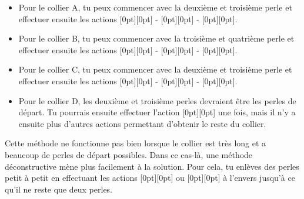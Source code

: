 {{\begin{itemize}
  \item Pour le collier A, tu peux commencer avec la deuxième et troisième perle et effectuer ensuite les actions \raisebox{-0.5ex}[0pt][0pt]{} - \raisebox{-0.5ex}[0pt][0pt]{} - \raisebox{-0.5ex}[0pt][0pt]{}.
  \item Pour le collier B, tu peux commencer avec la troisième et quatrième perle et effectuer ensuite les actions \raisebox{-0.5ex}[0pt][0pt]{} - \raisebox{-0.5ex}[0pt][0pt]{} - \raisebox{-0.5ex}[0pt][0pt]{}.
  \item Pour le collier C, tu peux commencer avec la deuxième et troisième perle et effectuer ensuite les actions \raisebox{-0.5ex}[0pt][0pt]{} - \raisebox{-0.5ex}[0pt][0pt]{} - \raisebox{-0.5ex}[0pt][0pt]{}.
  \item Pour le collier D, les deuxième et troisième perles devraient être les perles de départ. Tu pourrais ensuite effectuer l’action \raisebox{-0.5ex}[0pt][0pt]{} une fois, mais il n’y a ensuite plus d’autres actions permettant d’obtenir le reste du collier.
\end{itemize}

Cette méthode ne fonctionne pas bien lorsque le collier est très long et a beaucoup de perles de départ possibles. Dans ce cas-là, une méthode déconstructive mène plus facilement à la solution. Pour cela, tu enlèves des perles petit à petit en effectuant les actions \raisebox{-0.5ex}[0pt][0pt]{} ou \raisebox{-0.5ex}[0pt][0pt]{} à l’envers jusqu’à ce qu’il ne reste que deux perles.

}}
